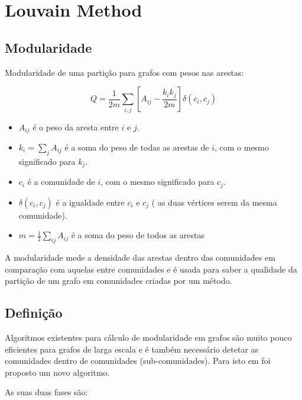 
\renewcommand{\algorithmicrequire}{\textbf{Input: }}
\renewcommand{\algorithmicensure}{\textbf{Output: }}

\section{Louvain Method}
\subsection{Modularidade}

Modularidade de uma partição para grafos com pesos nas arestas:

\begin{equation}
Q = \frac{1}{2m} \sum_{i,j} [ A_{ij} - \frac{k_i k_j}{2m} ] \delta(c_i ,c_j)
\label{eq:MN}
\end{equation}


\begin{itemize}
	\item $A_{ij}$ é o peso da aresta entre $i$ e $j$.
	\item $k_i = \sum_j A_{ij}$ é a soma do peso de todas as arestas de $i$, com o mesmo significado para $k_j$.
	\item $c_i$ é a comunidade de $i$, com o mesmo significado para $c_j$.
	\item $\delta(c_i,c_j)$ é a igualdade entre $c_i$ e $c_j$ ( as duas vértices serem da mesma comunidade).
	\item $m = \frac{1}{2}\sum_{ij} A_{ij}$ é a soma do peso de todos as arestas %
\end{itemize}

A modularidade mede a densidade das arestas dentro das comunidades em comparação com aquelas entre comunidades e é usada para saber a qualidade da partição de um grafo em comunidades criadas por um método. 


\subsection{Definição}
Algoritmos existentes para cálculo de modularidade em grafos são muito pouco eficientes para grafos de larga escala e é também necessário detetar as comunidades dentro de comunidades (sub-comunidades). Para isto em \cite{louvainDoc} foi proposto um novo algoritmo.

As suas duas fases são:

